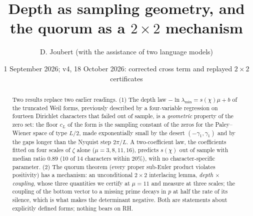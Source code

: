 \documentclass[11pt]{article}
\title{Depth as sampling geometry, and the quorum as a $2\times2$ mechanism}
\author{D. Joubert (with the assistance of two language models)}
\date{1 September 2026; v4, 18 October 2026: corrected cross term and replayed $2\times2$ certificates}
\begin{document}
\maketitle
\begin{abstract}
Two results replace two earlier readings. (1) The depth law $-\ln\lambda_{\min}=s(\chi)\mu+b$ of the truncated Weil forms, previously described by a four-variable regression on fourteen Dirichlet characters that failed out of sample, is a \emph{geometric} property of the zero set: the floor $c_L$ of the form is the sampling constant of the zeros for the Paley--Wiener space of type $L/2$, made exponentially small by the desert $(-\gamma_1,\gamma_1)$ and by the gaps longer than the Nyquist step $2\pi/L$. A two-coefficient law, the coefficients fitted on four scales of $\zeta$ alone ($\mu=3,8,11,16$), predicts $s(\chi)$ out of sample with median ratio $0.89$ (10 of 14 characters within $20\%$), with no character-specific parameter. (2) The quorum theorem (every proper sub-Euler product violates positivity) has a mechanism: an unconditional $2\times2$ interlacing lemma, \emph{depth $\times$ coupling}, whose three quantities we certify at $\mu=11$ and measure at three scales; the coupling of the bottom vector to a missing prime decays in $p$ at half the rate of its silence, which is what makes the determinant negative. Both are statements about explicitly defined forms; nothing bears on RH.
\end{abstract}

\begin{center}
\end{center}
\end{document}
